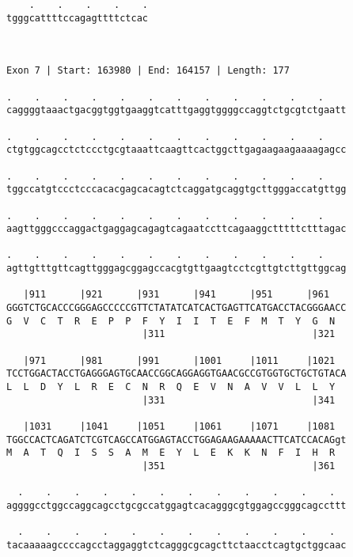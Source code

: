 \documentclass{article}
\begin{document}
\begin{Verbatim}
    .    .    .    .    .
tgggcattttccagagttttctcac
                         
                         
 
Exon 7 | Start: 163980 | End: 164157 | Length: 177
 
.    .    .    .    .    .    .    .    .    .    .    .    
caggggtaaactgacggtggtgaaggtcatttgaggtggggccaggtctgcgtctgaatt
                                                            
.    .    .    .    .    .    .    .    .    .    .    .    
ctgtggcagcctctccctgcgtaaattcaagttcactggcttgagaagaagaaaagagcc
                                                            
.    .    .    .    .    .    .    .    .    .    .    .    
tggccatgtccctcccacacgagcacagtctcaggatgcaggtgcttgggaccatgttgg
                                                            
.    .    .    .    .    .    .    .    .    .    .    .    
aagttgggcccaggactgaggagcagagtcagaatccttcagaaggctttttctttagac
                                                            
.    .    .    .    .    .    .    .    .    .    .    .    
agttgtttgttcagttgggagcggagccacgtgttgaagtcctcgttgtcttgttggcag
                                                            
   |911      |921      |931      |941      |951      |961   
GGGTCTGCACCCGGGAGCCCCCGTTCTATATCATCACTGAGTTCATGACCTACGGGAACC
G  V  C  T  R  E  P  P  F  Y  I  I  T  E  F  M  T  Y  G  N  
                        |311                          |321  
  
   |971      |981      |991      |1001     |1011     |1021  
TCCTGGACTACCTGAGGGAGTGCAACCGGCAGGAGGTGAACGCCGTGGTGCTGCTGTACA
L  L  D  Y  L  R  E  C  N  R  Q  E  V  N  A  V  V  L  L  Y  
                        |331                          |341  
  
   |1031     |1041     |1051     |1061     |1071     |1081  
TGGCCACTCAGATCTCGTCAGCCATGGAGTACCTGGAGAAGAAAAACTTCATCCACAGgt
M  A  T  Q  I  S  S  A  M  E  Y  L  E  K  K  N  F  I  H  R  
                        |351                          |361  
  
  .    .    .    .    .    .    .    .    .    .    .    .  
aggggcctggccaggcagcctgcgccatggagtcacagggcgtggagccgggcagccttt
                                                            
  .    .    .    .    .    .    .    .    .    .    .    .  
tacaaaaagccccagcctaggaggtctcagggcgcagcttctaacctcagtgctggcaac
                                                            

\end{Verbatim}
\end{document}
